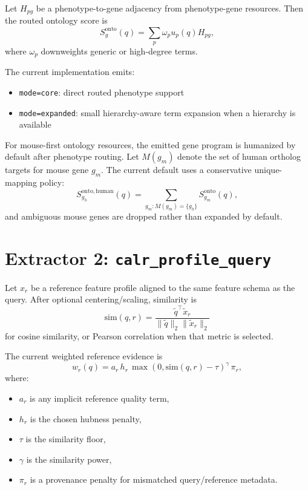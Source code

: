 \documentclass[11pt]{article}
\begin{document}
Let $H_{pg}$ be a phenotype-to-gene adjacency from phenotype-gene resources. Then the routed ontology score is
\begin{equation}
S^{\mathrm{onto}}_g(q) = \sum_p \omega_p u_p(q) H_{pg},
\end{equation}
where $\omega_p$ downweights generic or high-degree terms.

The current implementation emits:
\begin{itemize}[leftmargin=2em]
\item \texttt{mode=core}: direct routed phenotype support
\item \texttt{mode=expanded}: small hierarchy-aware term expansion when a hierarchy is available
\end{itemize}

For mouse-first ontology resources, the emitted gene program is humanized by default after phenotype routing. Let $M(g_m)$ denote the set of human ortholog targets for mouse gene $g_m$. The current default uses a conservative unique-mapping policy:
\begin{equation}
S^{\mathrm{onto,human}}_{g_h}(q) = \sum_{g_m : M(g_m)=\{g_h\}} S^{\mathrm{onto}}_{g_m}(q),
\end{equation}
and ambiguous mouse genes are dropped rather than expanded by default.

\section{Extractor 2: \texttt{calr\_profile\_query}}
Let $x_r$ be a reference feature profile aligned to the same feature schema as the query. After optional centering/scaling, similarity is
\begin{equation}
\mathrm{sim}(q,r) = \frac{\tilde{q}^\top \tilde{x}_r}{\|\tilde{q}\|_2 \|\tilde{x}_r\|_2}
\end{equation}
for cosine similarity, or Pearson correlation when that metric is selected.

The current weighted reference evidence is
\begin{equation}
w_r(q) = a_r \, h_r \, \max(0, \mathrm{sim}(q,r) - \tau)^\gamma \, \pi_r,
\end{equation}
where:
\begin{itemize}[leftmargin=2em]
\item $a_r$ is any implicit reference quality term,
\item $h_r$ is the chosen hubness penalty,
\item $\tau$ is the similarity floor,
\item $\gamma$ is the similarity power,
\item $\pi_r$ is a provenance penalty for mismatched query/reference metadata.
\end{itemize}
\end{document}
